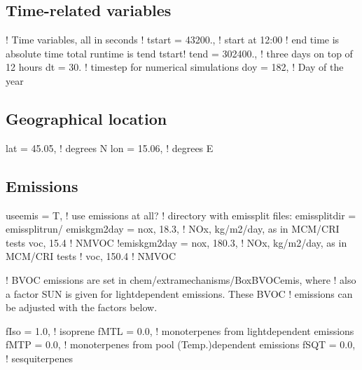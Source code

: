 \documentclass[a4paper,10pt,english]{sphinxmanual}
\begin{document}
\subsection{Time-related variables}
\label{\detokenize{GenChemDoc_quickstart:time-related-variables}}
\begin{sphinxVerbatim}[commandchars=\\\{\}]
! Time variables, all in seconds
! \PYGZhy{}\PYGZhy{}\PYGZhy{}\PYGZhy{}\PYGZhy{}\PYGZhy{}\PYGZhy{}\PYGZhy{}\PYGZhy{}\PYGZhy{}\PYGZhy{}\PYGZhy{}\PYGZhy{}\PYGZhy{}\PYGZhy{}\PYGZhy{}\PYGZhy{}\PYGZhy{}\PYGZhy{}\PYGZhy{}\PYGZhy{}\PYGZhy{}\PYGZhy{}\PYGZhy{}\PYGZhy{}\PYGZhy{}\PYGZhy{}\PYGZhy{}\PYGZhy{}\PYGZhy{}
 tstart = 43200., ! start at 12:00
! end time is absolute time \PYGZhy{}\PYGZgt{} total runtime is tend \PYGZhy{} tstart!
 tend = 302400.,  ! three days on top of 12 hours
 dt = 30.         ! time\PYGZhy{}step for numerical simulations
 doy = 182,        ! Day of the year
\end{sphinxVerbatim}


\subsection{Geographical location}
\label{\detokenize{GenChemDoc_quickstart:geographical-location}}
\begin{sphinxVerbatim}[commandchars=\\\{\}]
lat = 45.05,    ! degrees N
lon = 15.06,    ! degrees E
\end{sphinxVerbatim}


\subsection{Emissions}
\label{\detokenize{GenChemDoc_quickstart:emissions}}
\begin{sphinxVerbatim}[commandchars=\\\{\}]
 use\PYGZus{}emis = T,     ! use emissions at all?
! directory with emissplit files:
 emissplit\PYGZus{}dir = \PYGZsq{}emissplit\PYGZus{}run/\PYGZsq{}
 emis\PYGZus{}kgm2day = \PYGZsq{}nox\PYGZsq{}, 18.3, ! NOx, kg/m2/day, as in MCM/CRI tests
                \PYGZsq{}voc\PYGZsq{}, 15.4  ! NMVOC
 !emis\PYGZus{}kgm2day = \PYGZsq{}nox\PYGZsq{}, 180.3, ! NOx, kg/m2/day, as in MCM/CRI tests
 !               \PYGZsq{}voc\PYGZsq{}, 150.4  ! NMVOC

 ! BVOC emissions are set in chem/extra\PYGZus{}mechanisms/BoxBVOCemis, where
 ! also a factor SUN is given for light\PYGZhy{}dependent emissions. These BVOC
 ! emissions can be adjusted with the factors below.

 fIso = 1.0,                     ! isoprene
 fMTL = 0.0,                     ! monoterpenes from light\PYGZhy{}dependent emissions
 fMTP = 0.0,                     ! monoterpenes from pool (Temp.)\PYGZhy{}dependent emissions
 fSQT = 0.0,                     ! sesqui\PYGZhy{}terpenes
\end{sphinxVerbatim}
\end{document}
